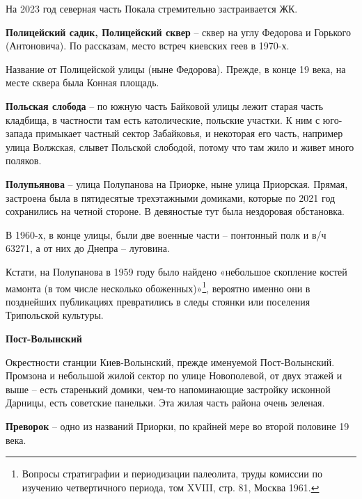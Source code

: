 На 2023 год северная часть Покала стремительно застраивается ЖК.\\

\medskip

\textbf{Полицейский садик, Полицейский сквер} – сквер на углу Федорова и Горького (Антоновича). По рассказам, место встреч киевских геев в 1970-х.

Название от Полицейской улицы (ныне Федорова). Прежде, в конце 19 века, на месте сквера была Конная площадь.\\

\medskip


\textbf{Польская слобода} – по южную часть Байковой улицы лежит старая часть кладбища, в частности там есть католические, польские участки. К ним с юго-запада примыкает частный сектор Забайковья, и некоторая его часть, например улица Волжская, слывет Польской слободой, потому что там жило и живет много поляков.\\

\medskip

\textbf{Полупьянова} – улица Полупанова на Приорке, ныне улица Приорская. Прямая, застроена была в пятидесятые трехэтажными домиками, которые по 2021 год сохранились на четной стороне. В девяностые тут была нездоровая обстановка.

В 1960-х, в конце улицы, были две военные части – понтонный полк и в/ч 63271, а от них до Днепра – луговина.

Кстати, на Полупанова в 1959 году было найдено «небольшое скопление костей мамонта (в том числе несколько обоженных)»\footnote{Вопросы
стратиграфии и периодизации палеолита, труды комиссии по изучению четвертичного периода, том
XVIII, стр. 81, Москва 1961.}, вероятно именно они в позднейших публикациях превратились в следы стоянки или поселения Трипольской культуры.\\

\medskip

\textbf{Пост-Волынский}

Окрестности станции Киев-Волынский, прежде именуемой Пост-Волынский. Промзона и небольшой жилой сектор по улице Новополевой, от двух этажей и выше – есть старенький домики, чем-то напоминающие застройку исконной Дарницы, есть советские  панельки. Эта жилая часть района очень зеленая.\\

\medskip


\textbf{Преворок} – одно из названий Приорки, по крайней мере во второй половине 19 века.\\

